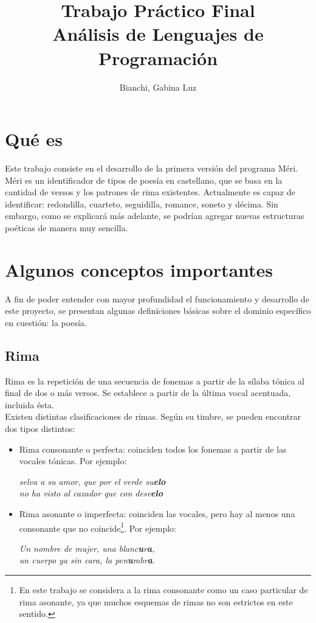 \documentclass[12pt, a4paper]{article}
\begin{document}
 
\title{Trabajo Práctico Final\\ Análisis de Lenguajes de Programación} 
\author{Bianchi, Gabina Luz} 
\maketitle

\section*{Qué es}
Este trabajo consiste en el desarrollo de la primera versión del programa Méri. Méri es un identificador de tipos de poesía en castellano, que se basa en la cantidad de versos y los patrones de rima existentes. Actualmente es capaz de identificar: redondilla, cuarteto, seguidilla, romance, soneto y décima.	
Sin embargo, como se explicará más adelante, se podrían agregar nuevas estructuras poéticas de manera muy sencilla.
\section*{Algunos conceptos importantes}
A fin de poder entender con mayor profundidad el funcionamiento y desarrollo de este proyecto, se presentan algunas definiciones básicas sobre el dominio específico en cuestión: la poesía.
\subsection*{Rima}
Rima es la repetición de una secuencia de fonemas a partir de la sílaba tónica al final de dos o más versos. Se establece a partir de la última vocal acentuada, incluida ésta.\\
Existen distintas clasificaciones de rimas. Según su timbre, se pueden encontrar dos tipos distintos:
\begin{itemize}
	\item Rima consonante o perfecta: coinciden todos los fonemas a partir de las vocales tónicas. Por ejemplo:
	
	\medskip
	
	\begin{center}
		\textit{selva a su amor, que por el verde su\textbf{elo}\\ no ha visto al cazador que con desv\textbf{elo}}
	\end{center}	 

	\item Rima asonante o imperfecta: coinciden las vocales, pero hay al menos una consonante que no coincide\footnote{En este trabajo se considera a la rima consonante como un caso particular de rima asonante, ya que muchos esquemas de rimas no son estrictos en este sentido.}. Por ejemplo:
	
	\medskip
	
	\begin{center}
			\textit{Un nombre de mujer, una blanc\textbf{u}r\textbf{a},\\un cuerpo ya sin cara, la pen\textbf{u}mbr\textbf{a}.}	
	\end{center}

\end{itemize}
\end{document}
